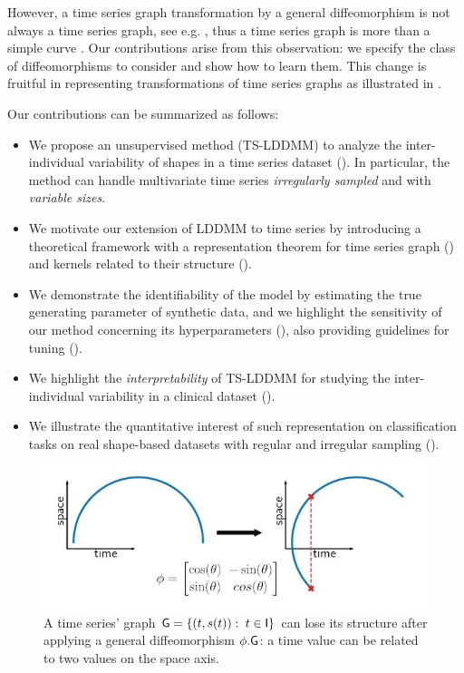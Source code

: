      
However, a time series graph transformation by a general diffeomorphism is not always a time series graph, see e.g. , thus a time series graph is more than a simple curve \cite{glaunes2008large}. Our contributions arise from this observation: we specify the class of diffeomorphisms to consider and show how to learn them. This change is fruitful in representing transformations of time series graphs as illustrated in .

Our contributions can be summarized as follows:
\begin{itemize}
  \item We propose an unsupervised method (TS-LDDMM) to analyze the inter-individual variability of shapes in a time series dataset (). In particular, the method can handle multivariate time series \textit{irregularly sampled} and with \textit{variable sizes}.
  
  \item We motivate our extension of LDDMM to time series by introducing a theoretical framework with a representation theorem for time series graph () and kernels related to their structure ().
  
  \item We demonstrate the identifiability of the model by estimating the true generating parameter of synthetic data, and we highlight the sensitivity of our method concerning its hyperparameters (), also providing guidelines for tuning ().
  
  \item We highlight the \textit{interpretability} of TS-LDDMM for studying the inter-individual variability in a clinical dataset ().
  
  \item We illustrate the quantitative interest of such representation on classification tasks on real shape-based datasets with regular and irregular sampling ().
\end{itemize}

\begin{figure}[t]
  \centering
  \includegraphics[width=0.7\linewidth]{"./pictures/diffeo.jpeg"}
  \caption{A time series' graph $\mathsf{G}=\{(t,s(t)): \; t\in\mathsf{I}\} $ can lose its structure after applying a general diffeomorphism $\phi.\mathsf{G}$: a time value can be related to two values on the space axis.}
  \label{fig:diffeo}
\end{figure}

